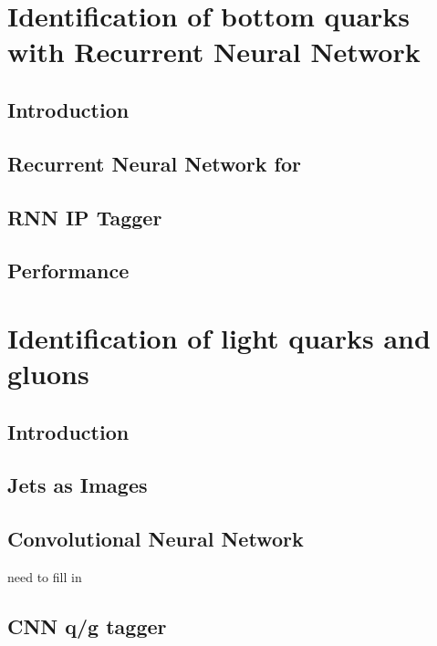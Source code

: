 \documentclass{report}
\begin{document}
\chapter{Identification of bottom quarks with Recurrent Neural Network}
\label{chap:btagging}
\section{Introduction}


\section{Recurrent Neural Network for \btagging}


\section{RNN IP Tagger}


\section{Performance}



\chapter{Identification of light quarks and gluons}
\label{chap:qgtagging}
\section{Introduction}


\section{Jets as Images}


\section{Convolutional Neural Network}
need to fill in

\section{CNN q/g tagger}

\end{document}
